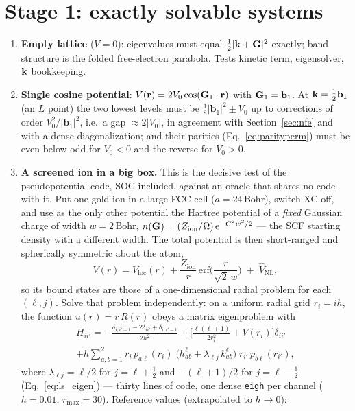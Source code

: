 \section{Stage 1: exactly solvable systems}
\begin{enumerate}[leftmargin=2em]
\item \textbf{Empty lattice} ($V = 0$): eigenvalues must equal
$\tfrac12|\mathbf{k}+\mathbf{G}|^2$ exactly; band structure is the folded free-electron
parabola. Tests kinetic term, eigensolver, $\mathbf{k}$ bookkeeping.
\item \textbf{Single cosine potential}: $V(\mathbf{r}) = 2V_0\cos(\mathbf{G}_1\cdot\mathbf{r})$
with $\mathbf{G}_1 = \mathbf b_1$. At $\mathbf{k} = \tfrac12\mathbf b_1$ (an $L$ point)
the two lowest levels must be $\tfrac18|\mathbf b_1|^2 \pm V_0$ up to
corrections of order $V_0^2/|\mathbf b_1|^2$, i.e.\ a gap
$\approx 2|V_0|$, in agreement with Section~\ref{sec:nfe} and with a dense
diagonalization; and their parities (Eq.~\eqref{eq:parityperm}) must be
even-below-odd for $V_0<0$ and the reverse for $V_0>0$.
\item \textbf{A screened ion in a big box.} This is the decisive test of
the pseudopotential code, SOC included, against an oracle that shares no
code with it. Put one gold ion in a large FCC cell ($a = 24$\,Bohr),
switch XC off, and use as the only other potential the Hartree potential
of a \emph{fixed} Gaussian charge of width $w = 2$\,Bohr,
$n(\mathbf{G}) = (Z_{\mathrm{ion}}/\Omega)\,\mathrm{e}^{-G^2w^2/2}$ --- the SCF starting
density with a different width. The total potential is then short-ranged
and spherically symmetric about the atom,
\[
V(r) = V_{\mathrm{loc}}(r) + \frac{Z_{\mathrm{ion}}}{r}\,
\mathrm{erf}\!\Big(\frac{r}{\sqrt2\,w}\Big) \;+\; \hat V_{\mathrm{NL}},
\]
so its bound states are those of a one-dimensional radial problem for each
$(\ell, j)$. Solve that problem independently: on a uniform radial grid
$r_i = ih$, the function $u(r) = r\,R(r)$ obeys a matrix eigenproblem with
\begin{multline*}
H_{ii'} = -\frac{\delta_{i,i'+1} - 2\delta_{ii'} + \delta_{i,i'-1}}{2h^2}
+ \Big[\frac{\ell(\ell+1)}{2r_i^2} + V(r_i)\Big]\delta_{ii'}\\
+ h\sum_{a,b=1}^{2} r_i\,p_{a\ell}(r_i)\;\big(h^\ell_{ab} + \lambda_{\ell j}\,k^\ell_{ab}\big)\;
r_{i'}\,p_{b\ell}(r_{i'}),
\end{multline*}
where $\lambda_{\ell j} = \ell/2$ for $j = \ell+\tfrac12$ and
$-(\ell+1)/2$ for $j = \ell-\tfrac12$ (Eq.~\eqref{eq:ls_eigen}) --- thirty
lines of code, one dense \texttt{eigh} per channel ($h = 0.01$,
$r_{\max} = 30$). Reference values (extrapolated to $h\to0$):

\end{enumerate}

